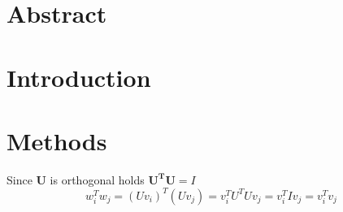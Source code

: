 \documentclass[%
oneside,                 %
final,                   %
10pt]{article}
\begin{document}







\thispagestyle{empty}


\tableofcontents
\newpage
\section{Abstract}
\section{Introduction}
\section{Methods}
Since $\mathbf{U}$ is orthogonal holds $\mathbf{U^TU} = I$
\begin{equation}
w_i^Tw_j = (Uv_i)^T(Uv_j)=v_i^TU^TUv_j=v_i^TIv_j = v_i^Tv_j
\end{equation}
\end{document}
